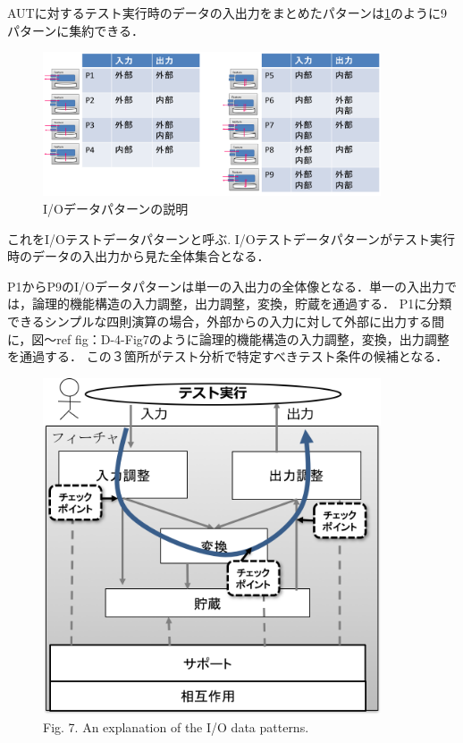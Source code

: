 \documentclass[a4paper,10pt]{jreport}
\begin{document}
AUTに対するテスト実行時のデータの入出力をまとめたパターンは\ref{fig:D-3-Fig11}のように9パターンに集約できる．
   \begin{figure}[htbp]
 \begin{center}
 \includegraphics[width=10cm]{./image/D-3-Fig5.png}
 \caption{I/Oデータパターンの説明}
 \label{fig:D-3-Fig11}
 \end{center}
  \end{figure}
これをI/Oテストデータパターンと呼ぶ.
I/Oテストデータパターンがテスト実行時のデータの入出力から見た全体集合となる．

P1からP9のI/Oデータパターンは単一の入出力の全体像となる．単一の入出力では，論理的機能構造の入力調整，出力調整，変換，貯蔵を通過する．
P1に分類できるシンプルな四則演算の場合，外部からの入力に対して外部に出力する間に，図〜ref {fig：D-4-Fig7}のように論理的機能構造の入力調整，変換，出力調整を通過する．
この３箇所がテスト分析で特定すべきテスト条件の候補となる．
  \begin{figure}[htbp]
 \begin{center}
 \includegraphics[width=10cm]{./image/D-4-Fig7.png}
 \caption{Fig. 7. An explanation of the I/O data patterns.}
 \label{fig:D-4-Fig7}
 \end{center}
  \end{figure}
\end{document}
